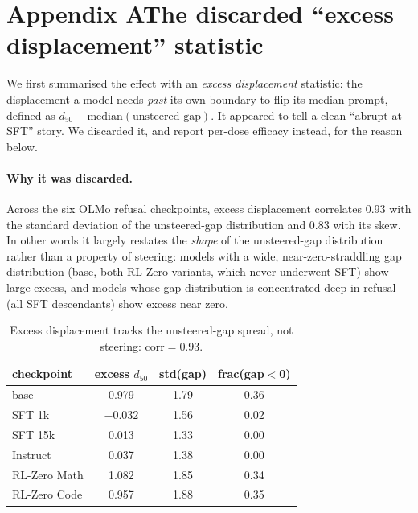 \section*{Appendix A\quad The discarded ``excess displacement'' statistic}

We first summarised the effect with an \emph{excess displacement} statistic: the displacement a
model needs \emph{past} its own boundary to flip its median prompt, defined as
$d_{50} - \mathrm{median}(\text{unsteered gap})$. It appeared to tell a clean ``abrupt at SFT''
story. We discarded it, and report per-dose efficacy instead, for the reason below.

\paragraph{Why it was discarded.} Across the six OLMo refusal checkpoints, excess displacement
correlates \num{0.93} with the standard deviation of the unsteered-gap distribution and \num{0.83}
with its skew. In other words it largely restates the \emph{shape} of the unsteered-gap
distribution rather than a property of steering: models with a wide, near-zero-straddling gap
distribution (base, both RL-Zero variants, which never underwent SFT) show large excess, and models
whose gap distribution is concentrated deep in refusal (all SFT descendants) show excess near zero.

\begin{table}[h]\centering\small
\begin{tabular}{lccc}
\toprule
checkpoint & excess $d_{50}$ & std(gap) & frac(gap$<$0) \\
\midrule
base       & 0.979 & 1.79 & 0.36 \\
SFT 1k     & $-0.032$ & 1.56 & 0.02 \\
SFT 15k    & 0.013 & 1.33 & 0.00 \\
Instruct   & 0.037 & 1.38 & 0.00 \\
RL-Zero Math & 1.082 & 1.85 & 0.34 \\
RL-Zero Code & 0.957 & 1.88 & 0.35 \\
\bottomrule
\end{tabular}
\caption{Excess displacement tracks the unsteered-gap spread, not steering: $\mathrm{corr}=0.93$.}
\end{table}

